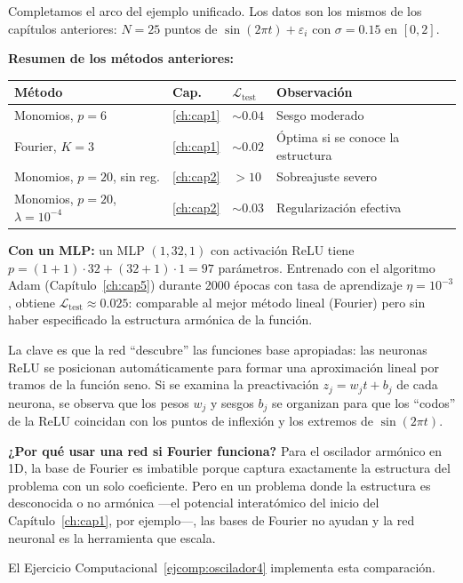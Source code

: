Completamos el arco del ejemplo unificado. Los datos son los mismos de
los capítulos anteriores: $N = 25$ puntos de $\sin(2\pi t) +
\varepsilon_i$ con $\sigma = 0.15$ en $[0, 2]$.

\textbf{Resumen de los métodos anteriores:}
\begin{center}
\begin{tabular}{llll}
\toprule
\textbf{Método} & \textbf{Cap.} & $\mathcal{L}_{\text{test}}$ &
\textbf{Observación} \\
\midrule
Monomios, $p = 6$ & \ref{ch:cap1} & $\sim 0.04$ & Sesgo moderado \\
Fourier, $K = 3$ & \ref{ch:cap1} & $\sim 0.02$ & Óptima si se
  conoce la estructura \\
Monomios, $p = 20$, sin reg. & \ref{ch:cap2} & $> 10$ & Sobreajuste
  severo \\
Monomios, $p = 20$, $\lambda = 10^{-4}$ & \ref{ch:cap2} & $\sim 0.03$
  & Regularización efectiva \\
\bottomrule
\end{tabular}
\end{center}

\textbf{Con un MLP:} un MLP $(1, 32, 1)$ con activación ReLU tiene
$p = (1+1)\cdot 32 + (32+1)\cdot 1 = 97$ parámetros. Entrenado con el
algoritmo Adam (Capítulo~\ref{ch:cap5}) durante 2000 épocas con tasa de
aprendizaje $\eta = 10^{-3}$, obtiene $\mathcal{L}_{\text{test}} \approx
0.025$: comparable al mejor método lineal (Fourier) pero sin haber
especificado la estructura armónica de la función.

La clave es que la red ``descubre'' las funciones base apropiadas: las
neuronas ReLU se posicionan automáticamente para formar una aproximación
lineal por tramos de la función seno. Si se examina la preactivación
$z_j = w_j t + b_j$ de cada neurona, se observa que los pesos $w_j$ y
sesgos $b_j$ se organizan para que los ``codos'' de la ReLU coincidan
con los puntos de inflexión y los extremos de $\sin(2\pi t)$.

\textbf{¿Por qué usar una red si Fourier funciona?} Para el oscilador
armónico en 1D, la base de Fourier es imbatible porque captura
exactamente la estructura del problema con un solo coeficiente. Pero
en un problema donde la estructura es desconocida o no armónica —el
potencial interatómico del inicio del Capítulo~\ref{ch:cap1}, por
ejemplo—, las bases de Fourier no ayudan y la red neuronal es la
herramienta que escala.

El Ejercicio Computacional~\ref{ejcomp:oscilador4} implementa esta
comparación.

